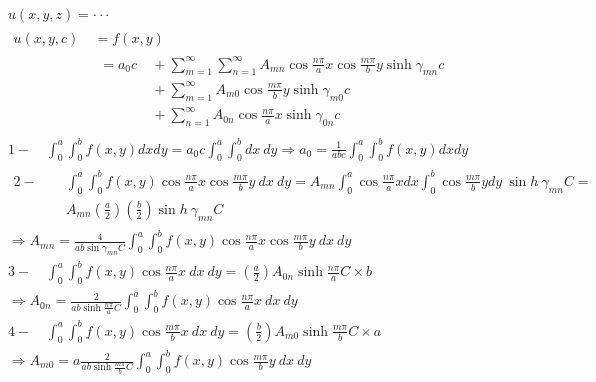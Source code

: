 \begin{equation*}
	\begin{aligned}
		{} &\
		u(x, y, z)= \cdot \cdot\cdot
		\\ &\
		\begin{aligned}
			u(x,y,c) {} &\
			 = f(x,y)
			 \\ &\
			 \begin{aligned}
			 	=a_0c {} &\
			 	+\sum_{m=1}^{\infty} \sum_{n=1}^{\infty} A_{m n} \cos \frac{n \pi}{a} x \cos \frac{m \pi}{b} y \sinh \gamma_{m n} c
			 	\\ &\
			 	+\sum_{m=1}^{\infty} A_{m 0} \cos \frac{m \pi}{b} y \sinh \gamma_{m 0} c
			 	\\ &\
			 	+\sum_{n=1}^{\infty} A_{0 n} \cos \frac{n \pi}{a} x  \sinh \gamma_{0 n} c
			 \end{aligned}
		\end{aligned}
		\\ &\
		1 -\quad  \int_{0}^{a} \int_{0}^{b} f(x, y) d xdy=a_{0} c \int_{0}^{a} \int_{0}^{b} d x \ d y \Rightarrow a_{0}= \frac{1}{a b c} \int_{0}^{a} \int_{0}^{b} f(x, y) d x d y
		\\ &\
		\begin{aligned}
			2-\quad
			{} &\
			\int_{0}^{a} \int_{0}^{b} f(x, y)\cos \frac{n \pi}{a} x \cos \frac{m \pi}{b} y \ d x \ dy=A_{mn} \int_{0}^{a} \cos \frac{n \pi}{a} xdx \int_{0}^{b}  \cos \frac{m \pi}{b} y d y \ \sin h \  \gamma_{mn} C= 
			\\ &\
			A_{mn}( \frac{a}{2})( \frac{b}{2}) \sin h \  \gamma_{mn} C
		\end{aligned}
	\\ &\
	\Rightarrow A_{mn}=\frac{4}{ab \sin \gamma_{mn}C}\int_{0}^{a} \int_{0}^{b} f(x, y)\cos \frac{n \pi}{a} x \cos \frac{m \pi}{b} y \ d x \ dy
	\\ &\
	3 - \quad \int_{0}^{a} \int_{0}^{b} f(x, y)\cos \frac{n \pi}{a} x  \ d x \ dy=( \frac{a}{2})A_{0n} \sinh\frac{n \pi}{a}C \times b
	\\ &\
	\Rightarrow A_{0n}=\frac{2}{ab \sinh \frac{n \pi}{a}C}\int_{0}^{a} \int_{0}^{b} f(x, y)\cos \frac{n \pi}{a} x  \ d x \ dy
	\\ &\
	4 - \quad \int_{0}^{a} \int_{0}^{b} f(x, y)\cos \frac{m \pi}{b} x  \ d x \ dy=( \frac{b}{2})A_{m0} \sinh\frac{m \pi}{b}C \times a
	\\ &\
	\Rightarrow A_{m0}=a\frac{2}{ab \sinh \frac{m \pi}{b}C}\int_{0}^{a} \int_{0}^{b} f(x, y)\cos \frac{m \pi}{b} y  \ d x \ dy
	\end{aligned}
\end{equation*}
